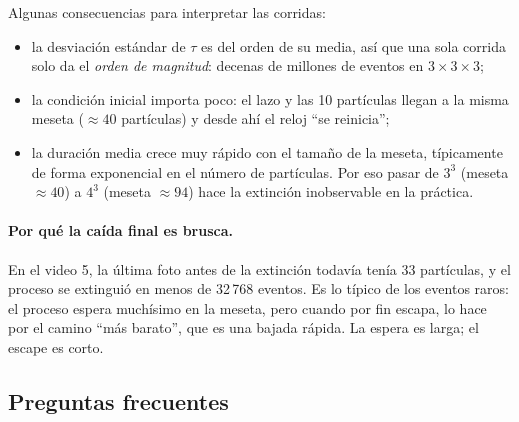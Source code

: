 \documentclass[11pt,a4paper]{article}
\theoremstyle{plain}
\theoremstyle{remark}
\begin{document}
Algunas consecuencias para interpretar las corridas:
\begin{itemize}[nosep]
  \item la desviación estándar de $\tau$ es del orden de su media, así que una sola corrida solo da el \emph{orden de magnitud}: decenas de millones de eventos en $3\times3\times3$;
  \item la condición inicial importa poco: el lazo y las 10 partículas llegan a la misma meseta ($\approx40$ partículas) y desde ahí el reloj ``se reinicia'';
  \item la duración media crece muy rápido con el tamaño de la meseta, típicamente de forma exponencial en el número de partículas. Por eso pasar de $3^3$ (meseta $\approx40$) a $4^3$ (meseta $\approx94$) hace la extinción inobservable en la práctica.
\end{itemize}

\paragraph{Por qué la caída final es brusca.} En el video 5, la última foto antes de la extinción todavía tenía 33 partículas, y el proceso se extinguió en menos de 32\,768 eventos. Es lo típico de los eventos raros: el proceso espera muchísimo en la meseta, pero cuando por fin escapa, lo hace por el camino ``más barato'', que es una bajada rápida. La espera es larga; el escape es corto.

\subsection{Preguntas frecuentes}
\end{document}
